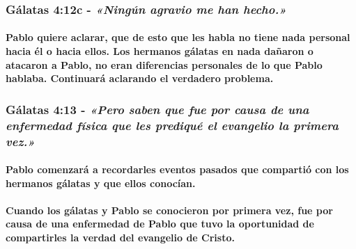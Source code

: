 \documentclass[11a pt,twoside]{article}
\newcommand{\scripture}[1]{%
  {\fontsize{12pt}{16pt}\selectfont\ScriptureFont\itshape #1}%
}
\let\oldsubsubsection\subsubsection
\renewcommand{\subsubsection}{\needspace{4\baselineskip}\oldsubsubsection}
\let\oldparagraph\paragraph
\renewcommand{\paragraph}{\needspace{3\baselineskip}\oldparagraph}
\begin{document}
\subsubsection{\texorpdfstring{Gálatas 4:12c -
\scripture{«Ningún agravio me han hecho.»}}{Gálatas 4:12c - }}\label{guxe1latas-412c---ninguxfan-agravio-me-han-hecho.}

\paragraph{Pablo quiere aclarar, que de esto que les habla no tiene nada
personal hacia él o hacia ellos. Los hermanos gálatas en nada dañaron o
atacaron a Pablo, no eran diferencias personales de lo que Pablo
hablaba. Continuará aclarando el verdadero
problema.}\label{pablo-quiere-aclarar-que-de-esto-que-les-habla-no-tiene-nada-personal-hacia-uxe9l-o-hacia-ellos.-los-hermanos-guxe1latas-en-nada-dauxf1aron-o-atacaron-a-pablo-no-eran-diferencias-personales-de-lo-que-pablo-hablaba.-continuaruxe1-aclarando-el-verdadero-problema.}

\subsubsection{\texorpdfstring{Gálatas 4:13 -
\scripture{«Pero saben que fue por causa de una enfermedad física que les prediqué el evangelio la primera vez.»}}{Gálatas 4:13 - }}\label{guxe1latas-413---pero-saben-que-fue-por-causa-de-una-enfermedad-fuxedsica-que-les-prediquuxe9-el-evangelio-la-primera-vez.}

\paragraph{Pablo comenzará a recordarles eventos pasados que compartió
con los hermanos gálatas y que ellos
conocían.}\label{pablo-comenzaruxe1-a-recordarles-eventos-pasados-que-compartiuxf3-con-los-hermanos-guxe1latas-y-que-ellos-conocuxedan.}

\paragraph{Cuando los gálatas y Pablo se conocieron por primera vez, fue
por causa de una enfermedad de Pablo que tuvo la oportunidad de
compartirles la verdad del evangelio de
Cristo.}\label{cuando-los-guxe1latas-y-pablo-se-conocieron-por-primera-vez-fue-por-causa-de-una-enfermedad-de-pablo-que-tuvo-la-oportunidad-de-compartirles-la-verdad-del-evangelio-de-cristo.}
\end{document}
